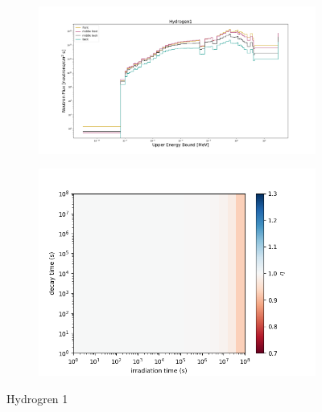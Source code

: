 \begin{figure}[!ht]
    \begin{subfigure}{0.5\textwidth}
        \includegraphics[scale=0.23, trim={4cm 1cm 4cm 2cm},clip]{figs/hydrogen1_flux.png}
    \end{subfigure}
    \begin{subfigure}{0.5\textwidth}
        \centering
        \includegraphics[scale=0.45, trim={0cm 0cm 2cm 0cm},clip]{figs/hydrogen1_front.png}
    \end{subfigure}
    \caption{Hydrogren 1 }
    \label{fig:1spec_8v}
\end{figure}
